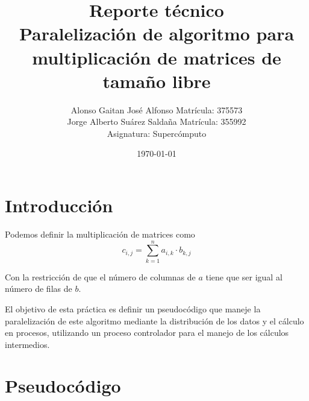 \documentclass[12pt,a4paper]{article}
\title{\textbf{Reporte técnico}\\[0.4em]\Large Paralelización de algoritmo para multiplicación de matrices de tamaño libre}
\author{Alonso Gaitan José Alfonso Matrícula: 375573\\
Jorge Alberto Suárez Saldaña Matrícula: 355992\\
Asignatura: Supercómputo}
\date{\today}
\begin{document}
\maketitle
\section{Introducción}
Podemos definir la multiplicación de matrices como
\begin{equation}
c_{i,j} = \sum^n_{k=1} a_{i,k} \cdot b_{k, j}
\end{equation}

Con la restricción de que el número de columnas de $a$ tiene que ser igual al número de filas de $b$.

El objetivo de esta práctica es definir un pseudocódigo que maneje la paralelización de este algoritmo mediante la distribución de los datos y el cálculo en procesos, utilizando un proceso controlador para el manejo de los cálculos intermedios.

\section{Pseudocódigo}
\end{document}
